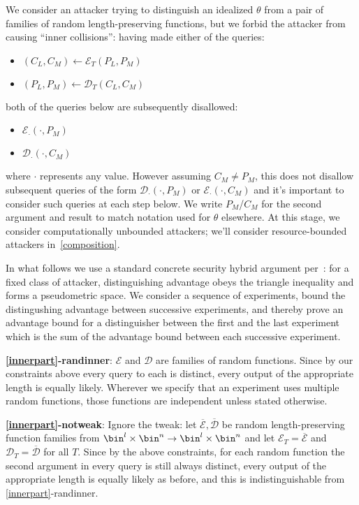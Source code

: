 \documentclass[journal=tosc,preprint,floatrow,submission]{iacrtrans}
\newcommand*{\xprm}[2]{\textsf{\ref*{#1}-#2}}
\newcommand*{\xprmtitle}[2]{\textbf{\xprm{#1}{#2}}}
\newcommand*{\calE}{\mathcal{E}}
\newcommand*{\calD}{\mathcal{D}}
\newcommand*{\barE}{\overline{\calE}}
\newcommand*{\barD}{\overline{\calD}}
\begin{document}
We consider an attacker trying to distinguish an idealized $\theta$ from a
pair of families of random length-preserving functions,
but we forbid the attacker from causing ``inner collisions'':
having made either of the queries: \label{constraints}
\begin{itemize}
    \item $(C_L, C_M) \leftarrow \calE_T(P_L, P_M)$
    \item $(P_L, P_M) \leftarrow \calD_T(C_L, C_M)$
\end{itemize}
both of the queries below are subsequently disallowed:
\begin{itemize}
    \item $\calE_\cdotp(\cdotp, P_M)$
    \item $\calD_\cdotp(\cdotp, C_M)$
\end{itemize}
where $\cdotp$ represents any value. However assuming $C_M \neq P_M$, this does not disallow
subsequent queries of the form $\calD_\cdotp(\cdotp, P_M)$ or $\calE_\cdotp(\cdotp, C_M)$
and it's important to consider such queries at each step below. We write
$P_M$/$C_M$ for the second argument and result to match notation used for $\theta$ elsewhere.
At this stage, we consider computationally unbounded attackers; we'll consider resource-bounded
attackers in~\autoref{composition}.

In what follows we use a standard concrete security hybrid argument per~\cite{concrete,games}:
for a fixed class of attacker, distinguishing advantage obeys the triangle inequality and
forms a pseudometric space. We consider a
sequence of experiments, bound the distingushing advantage between successive
experiments, and thereby
prove an advantage bound for a distinguisher between the first and the last experiment
which is the sum of the advantage bound between each successive experiment.

\xprmtitle{innerpart}{randinner}: $\calE$ and $\calD$ are families of
random functions. Since by our constraints above every query to each
is distinct, every output of the
appropriate length is equally likely. Wherever we specify that an experiment uses multiple random
functions, those functions are independent unless stated otherwise.

\xprmtitle{innerpart}{notweak}: Ignore the tweak: let
$\barE, \barD$ be random length-preserving function families from
$\bin^l \times \bin^n \rightarrow \bin^l \times \bin^n$
and let $\calE_T = \barE$ and $\calD_T = \barD$ for all $T$.
Since by the above constraints, for each random function the second argument in every query
is still always distinct, every output of the appropriate length is equally
likely as before, and this is indistinguishable from \xprm{innerpart}{randinner}.
\end{document}
